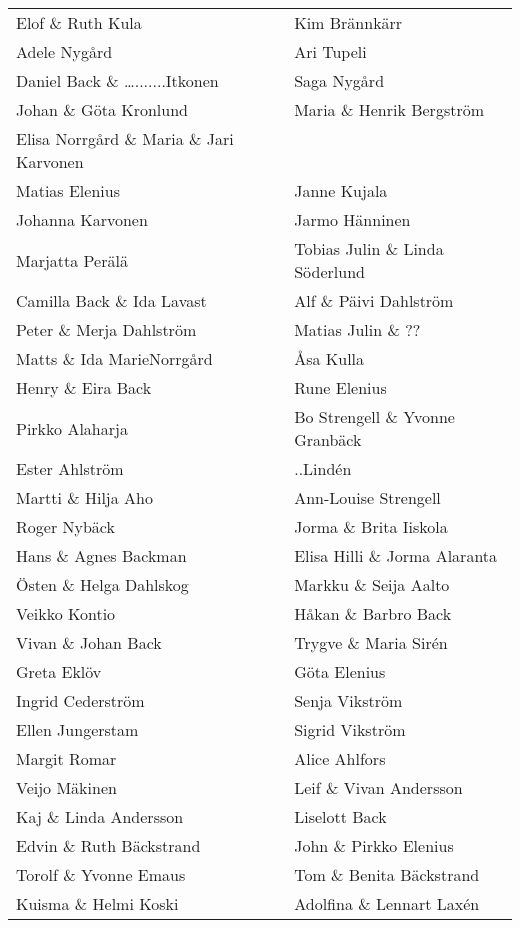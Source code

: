 \begin{center}
  \begin{tabular}{l l}
    \hline
    Elof \& Ruth Kula &  Kim Brännkärr \\
    Adele Nygård & Ari Tupeli \\
    Daniel Back \& ….......Itkonen & Saga Nygård \\
    Johan \& Göta Kronlund & Maria \& Henrik Bergström \\
    Elisa Norrgård \& Maria \& Jari Karvonen \\
    Matias Elenius & Janne Kujala \\
    Johanna Karvonen & Jarmo Hänninen \\
    Marjatta Perälä & Tobias Julin \& Linda Söderlund \\
    Camilla Back \& Ida Lavast & Alf \& Päivi Dahlström \\
    Peter \& Merja Dahlström & Matias Julin \&  ?? \\
    Matts \& Ida MarieNorrgård & Åsa Kulla \\
    Henry \& Eira Back & Rune Elenius \\
    Pirkko Alaharja & Bo Strengell \& Yvonne Granbäck \\
    Ester Ahlström & ..Lindén \\
    Martti \& Hilja Aho & Ann-Louise Strengell \\
    Roger Nybäck & Jorma \& Brita Iiskola \\
    Hans \& Agnes Backman & Elisa Hilli \& Jorma Alaranta \\
    Östen \& Helga Dahlskog & Markku \& Seija Aalto \\
    Veikko Kontio & Håkan \& Barbro Back \\
    Vivan \& Johan Back & Trygve \& Maria Sirén \\
    Greta Eklöv & Göta Elenius \\
    Ingrid Cederström & Senja Vikström \\
    Ellen Jungerstam & Sigrid Vikström \\
    Margit Romar & Alice Ahlfors \\
    Veijo Mäkinen & Leif \& Vivan Andersson \\
    Kaj \& Linda Andersson & Liselott Back \\
    Edvin \& Ruth Bäckstrand & John \& Pirkko Elenius \\
    Torolf \& Yvonne Emaus & Tom \& Benita Bäckstrand \\
    Kuisma \& Helmi Koski & Adolfina \& Lennart Laxén \\

\end{tabular}
\end{center}
